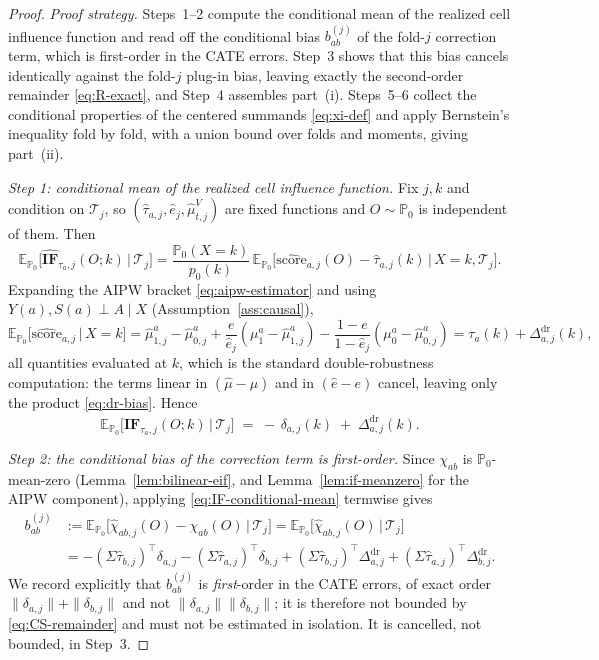 \documentclass[11pt]{article}
\theoremstyle{plain}
\theoremstyle{definition}
\theoremstyle{remark}
\newcommand{\E}{\mathbb{E}}
\newcommand{\PP}{\mathbb{P}}
\begin{document}
\begin{proof}
\emph{Proof strategy.} Steps~1--2 compute the conditional mean of the realized cell
influence function and read off the conditional bias $b^{(j)}_{ab}$ of the fold-$j$
correction term, which is first-order in the CATE errors. Step~3 shows that this bias
cancels identically against the fold-$j$ plug-in bias, leaving exactly the second-order
remainder \eqref{eq:R-exact}, and Step~4 assembles part~(i). Steps~5--6 collect the
conditional properties of the centered summands \eqref{eq:xi-def} and apply Bernstein's
inequality fold by fold, with a union bound over folds and moments, giving part~(ii).

\emph{Step 1: conditional mean of the realized cell influence function.} Fix $j,k$ and
condition on $\mathcal T_j$, so $(\hat\tau_{a,j},\hat e_j,\hat\mu^V_{t,j})$ are fixed
functions and $O\sim\PP_0$ is independent of them. Then
\[
    \E_{\PP_0}\big[\widehat{\mathbf{IF}}_{\tau_a,j}(O;k)\,\big|\,\mathcal T_j\big]
    =\frac{\PP_0(X=k)}{p_0(k)}\,\E_{\PP_0}\big[\widehat{\mathrm{score}}_{a,j}(O)-\hat\tau_{a,j}(k)\,\big|\,X=k,\mathcal T_j\big].
\]
Expanding the AIPW bracket \eqref{eq:aipw-estimator} and using
$Y(a),S(a)\perp A\mid X$ (Assumption~\ref{ass:causal}),
\[
    \E_{\PP_0}\big[\widehat{\mathrm{score}}_{a,j}\,\big|\,X=k\big]
    =\hat\mu^a_{1,j}-\hat\mu^a_{0,j}+\frac{e}{\hat e_j}(\mu^a_1-\hat\mu^a_{1,j})-\frac{1-e}{1-\hat e_j}(\mu^a_0-\hat\mu^a_{0,j})
    =\tau_a(k)+\Delta^{\mathrm{dr}}_{a,j}(k),
\]
all quantities evaluated at $k$, which is the standard double-robustness computation: the
terms linear in $(\hat\mu-\mu)$ and in $(\hat e-e)$ cancel, leaving only the product
\eqref{eq:dr-bias}. Hence
\begin{equation}\label{eq:IF-conditional-mean}
    \E_{\PP_0}\big[\widehat{\mathbf{IF}}_{\tau_a,j}(O;k)\,\big|\,\mathcal T_j\big]\;=\;-\,\delta_{a,j}(k)\;+\;\Delta^{\mathrm{dr}}_{a,j}(k).
\end{equation}

\emph{Step 2: the conditional bias of the correction term is first-order.} Since
$\chi_{ab}$ is $\PP_0$-mean-zero (Lemma~\ref{lem:bilinear-eif}, and
Lemma~\ref{lem:if-meanzero} for the AIPW component), applying
\eqref{eq:IF-conditional-mean} termwise gives
\begin{equation}\label{eq:bk}
\begin{aligned}
    b^{(j)}_{ab}&:=\E_{\PP_0}\big[\hat\chi_{ab,j}(O)-\chi_{ab}(O)\,\big|\,\mathcal T_j\big]
    =\E_{\PP_0}\big[\hat\chi_{ab,j}(O)\,\big|\,\mathcal T_j\big]\\
    &=-(\Sigma\hat\tau_{b,j})^\top\delta_{a,j}-(\Sigma\hat\tau_{a,j})^\top\delta_{b,j}
    +(\Sigma\hat\tau_{b,j})^\top\Delta^{\mathrm{dr}}_{a,j}+(\Sigma\hat\tau_{a,j})^\top\Delta^{\mathrm{dr}}_{b,j}.
\end{aligned}
\end{equation}
We record explicitly that $b^{(j)}_{ab}$ is \emph{first}-order in the CATE errors, of
exact order $\|\delta_{a,j}\|+\|\delta_{b,j}\|$ and not
$\|\delta_{a,j}\|\|\delta_{b,j}\|$; it is therefore not bounded by
\eqref{eq:CS-remainder} and must not be estimated in isolation. It is cancelled, not
bounded, in Step~3.


\end{proof}
\end{document}
